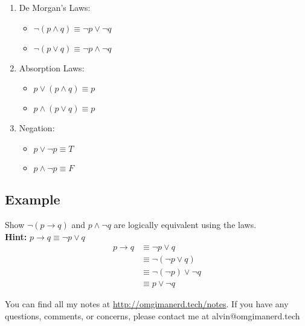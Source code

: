 \documentclass[letterpaper, 12pt]{math}
\begin{document}
\begin{enumerate}
  \item De Morgan's Laws:
  \begin{itemize}
    \item \( \neg{(p \wedge q)} \equiv \neg{p} \vee \neg{q} \)
    \item \( \neg{(p \vee q)} \equiv \neg{p} \wedge \neg{q} \)
  \end{itemize}
  \item Absorption Laws:
  \begin{itemize}
    \item \( p \vee (p \wedge q) \equiv p \)
    \item \( p \wedge (p \vee q) \equiv p \)
  \end{itemize}
  \item Negation:
  \begin{itemize}
    \item \( p \vee \neg{p} \equiv T \)
    \item \( p \wedge \neg{p} \equiv F \)
  \end{itemize}
\end{enumerate}

\subsection*{Example}
Show \( \neg{(p \to q)} \) and \( p \wedge \neg{q} \) are logically equivalent
using the laws. \\
\textbf{Hint:} \( p \to q \equiv \neg{p} \vee q \)
\begin{align*}
  p \to q &\equiv \neg{p} \vee q \\
  &\equiv \neg{(\neg{p} \vee q)} \\
  &\equiv \neg{(\neg{p})} \vee \neg{q} \\
  &\equiv p \vee \neg{q}
\end{align*}

\begin{center}
  You can find all my notes at \url{http://omgimanerd.tech/notes}. If you have
  any questions, comments, or concerns, please contact me at
  alvin@omgimanerd.tech
\end{center}
\end{document}
